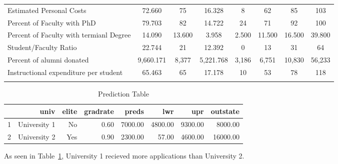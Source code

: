 \documentclass{article}\usepackage[]{graphicx}\usepackage[]{color}
\begin{document}
\begin{table}
\begin{tabular}{@{\extracolsep{5pt}}lccccccc}
Estimated Personal Costs & 72.660 & 75 & 16.328 & 8 & 62 & 85 & 103 \\ 
Percent of Faculty with PhD & 79.703 & 82 & 14.722 & 24 & 71 & 92 & 100 \\ 
Percent of Faculty with termianl Degree & 14.090 & 13.600 & 3.958 & 2.500 & 11.500 & 16.500 & 39.800 \\ 
Student/Faculty Ratio & 22.744 & 21 & 12.392 & 0 & 13 & 31 & 64 \\ 
Percent of alumni donated & 9,660.171 & 8,377 & 5,221.768 & 3,186 & 6,751 & 10,830 & 56,233 \\ 
Instructional expenditure per student & 65.463 & 65 & 17.178 & 10 & 53 & 78 & 118 \\ 
\hline \\[-1.8ex] 
\end{tabular} 
\end{table} 



\begin{table}[ht]
\centering
\begin{tabular}{|l|rrrrrrr|}
  \hline
 & univ & elite & gradrate & preds & lwr & upr & outstate \\ 
  \hline
1 & University 1 & No & 0.60 & 7000.00 & 4800.00 & 9300.00 & 8000.00 \\ 
  2 & University 2 & Yes & 0.90 & 2300.00 & 57.00 & 4600.00 & 16000.00 \\ 
   \hline
\end{tabular}
\caption{Prediction Table} 
\label{pred_table}
\end{table}


As seen in Table~\ref{pred_table}, University 1 recieved more applications than University 2. 
\end{document}
